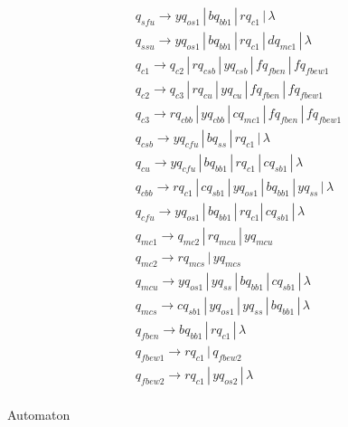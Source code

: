 \documentclass{article}
\begin{document}
\begin{mylist}
\begin{align*}
&q_{sfu} \rightarrow yq_{os1} \, | \, bq_{bb1} \, | \, rq_{c1} \, | \, \lambda\\ 
&q_{ssu} \rightarrow yq_{os1} \, | \, bq_{bb1} \, | \, rq_{c1} \, | \, dq_{mc1}\, | \, \lambda\\ 
&q_{c1} \rightarrow q_{c2} \, | \,  rq_{csb} \, | \, yq_{csb} \, | \, fq_{fben} \, | \, fq_{fbew1}\\ 
&q_{c2} \rightarrow q_{c3} \, | \,  rq_{cu} \, | \, yq_{cu} \, | \, fq_{fben} \, | \, fq_{fbew1}\\ 
&q_{c3} \rightarrow rq_{cbb} \, | \,  yq_{cbb} \, | \, cq_{mc1} \, | \, fq_{fben} \, | \, fq_{fbew1}\ \\ 
&q_{csb} \rightarrow yq_{cfu} \, | \,  bq_{ss} \, | \, rq_{c1} \, | \, \lambda \\ 
&q_{cu} \rightarrow yq_{cfu} \, | \,  bq_{bb1} \, | \, rq_{c1} \, | \, cq_{sb1} \, | \, \lambda \\ 
&q_{cbb} \rightarrow rq_{c1} \, | \,  cq_{sb1} \, | \, yq_{os1} \, | \, bq_{bb1} \, | \, yq_{ss} \, | \, \lambda \\ 
&q_{cfu} \rightarrow yq_{os1} \, | \,  bq_{bb1} \, | \, rq_{c1} | \, cq_{sb1} \, | \, \lambda\\ 
&q_{mc1} \rightarrow q_{mc2} \, | \, rq_{mcu} \, | \, yq_{mcu}\\
&q_{mc2} \rightarrow rq_{mcs} \, | \, yq_{mcs}\\
&q_{mcu} \rightarrow yq_{os1} \, | \, yq_{ss} \, | \, bq_{bb1} \, | \, cq_{sb1} \, | \, \lambda\\
&q_{mcs} \rightarrow cq_{sb1} \, | \, yq_{os1} \, | \, yq_{ss} \, | \, bq_{bb1}\, | \, \lambda\\
&q_{fben} \rightarrow bq_{bb1} \, | \, rq_{c1} \, | \, \lambda\\
&q_{fbew1} \rightarrow rq_{c1} \, | \, q_{fbew2} \\
&q_{fbew2} \rightarrow rq_{c1} \, | \, yq_{os2} \, | \, \lambda\\
\end{align*}

\newpage
{}
\item Automaton

\begin{center}


\end{center}
\end{mylist}
\end{document}
